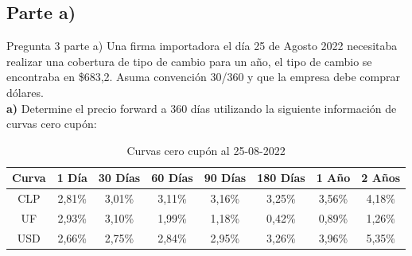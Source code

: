 \documentclass{beamer}
\begin{document}
\subsection{Parte a)}
\begin{frame}{Pregunta 3 parte a)}
  Una firma importadora el día 25 de Agosto 2022 necesitaba realizar una cobertura de tipo de cambio 
para un año, el tipo de cambio se encontraba en \$683,2. Asuma convención 30/360 y que la empresa debe comprar dólares.\\
\textbf{a)} Determine el precio forward a 360 días utilizando la siguiente información de curvas cero cupón:
\begin{table}[h!]
    \centering
    \caption{Curvas cero cupón al 25-08-2022}
    \begin{tabular}{|c|c|c|c|c|c|c|c|}
    \hline
    \textbf{Curva} & \textbf{1 Día} & \textbf{30 Días} & \textbf{60 Días} & \textbf{90 Días} & \textbf{180 Días} & \textbf{1 Año} & \textbf{2 Años} \\
    \hline
    CLP & 2{,}81\% & 3{,}01\% & 3{,}11\% & 3{,}16\% & 3{,}25\% & 3{,}56\% & 4{,}18\% \\
    UF  & 2{,}93\% & 3{,}10\% & 1{,}99\% & 1{,}18\% & 0{,}42\% & 0{,}89\% & 1{,}26\% \\
    USD & 2{,}66\% & 2{,}75\% & 2{,}84\% & 2{,}95\% & 3{,}26\% & 3{,}96\% & 5{,}35\% \\
    \hline
    \end{tabular}
\end{table}
\end{frame}
\end{document}

